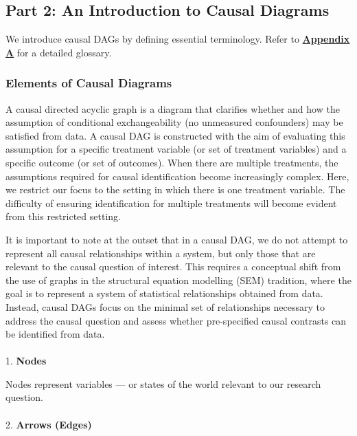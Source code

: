 \documentclass[
  singlecolumn]{article}
\makeatletter
\let\oldparagraph\paragraph
\renewcommand{\paragraph}{
    \@ifstar
      \xxxParagraphStar
      \xxxParagraphNoStar
  }
\newcommand{\xxxParagraphStar}[1]{\oldparagraph*{#1}\mbox{}}
\newcommand{\xxxParagraphNoStar}[1]{\oldparagraph{#1}\mbox{}}
\makeatother
\begin{document}
\subsection{Part 2: An Introduction to Causal
Diagrams}\label{section-part2}

We introduce causal DAGs by defining essential terminology. Refer to
\hyperref[appendix-a]{\textbf{Appendix A}} for a detailed glossary.

\subsubsection{Elements of Causal
Diagrams}\label{elements-of-causal-diagrams}

A causal directed acyclic graph is a diagram that clarifies whether and
how the assumption of conditional exchangeability (no unmeasured
confounders) may be satisfied from data. A causal DAG is constructed
with the aim of evaluating this assumption for a specific treatment
variable (or set of treatment variables) and a specific outcome (or set
of outcomes). When there are multiple treatments, the assumptions
required for causal identification become increasingly complex. Here, we
restrict our focus to the setting in which there is one treatment
variable. The difficulty of ensuring identification for multiple
treatments will become evident from this restricted setting.

It is important to note at the outset that in a causal DAG, we do not
attempt to represent all causal relationships within a system, but only
those that are relevant to the causal question of interest. This
requires a conceptual shift from the use of graphs in the structural
equation modelling (SEM) tradition, where the goal is to represent a
system of statistical relationships obtained from data. Instead, causal
DAGs focus on the minimal set of relationships necessary to address the
causal question and assess whether pre-specified causal contrasts can be
identified from data.

\paragraph{\texorpdfstring{1. \textbf{Nodes}}{1. Nodes}}\label{nodes}

Nodes represent variables --- or states of the world relevant to our
research question.

\paragraph{\texorpdfstring{2. \textbf{Arrows
(Edges)}}{2. Arrows (Edges)}}\label{arrows-edges}
\end{document}
